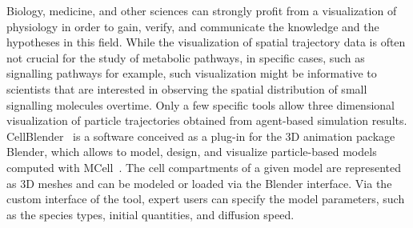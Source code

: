 Biology, medicine, and other sciences can strongly profit from a visualization of physiology in order to gain, verify, and communicate the knowledge and the hypotheses in this field.
While the visualization of spatial trajectory data is often not crucial for the study of metabolic pathways, in specific cases, such as signalling pathways for example, such visualization might be informative to scientists that are interested in observing the spatial distribution of small signalling molecules overtime.
Only a few specific tools allow three dimensional visualization of particle trajectories obtained from agent-based simulation results.
CellBlender~\cite{cellblender} is a software conceived as a plug-in for the 3D animation package Blender, which allows to model, design, and visualize particle-based models computed with MCell~\cite{kerr2008fast}.
The cell compartments of a given model are represented as 3D meshes and can be modeled or loaded via the Blender interface.
Via the custom interface of the tool, expert users can specify the model parameters, such as the species types, initial quantities, and diffusion speed.

